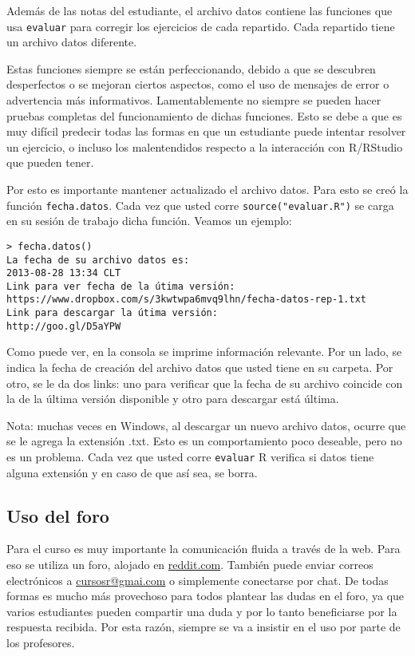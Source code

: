 \documentclass[]{article}
\begin{document}
Además de las notas del estudiante, el archivo datos contiene las
funciones que usa \texttt{evaluar} para corregir los ejercicios de cada
repartido. Cada repartido tiene un archivo datos diferente.

Estas funciones siempre se están perfeccionando, debido a que se
descubren desperfectos o se mejoran ciertos aspectos, como el uso de
mensajes de error o advertencia más informativos. Lamentablemente no
siempre se pueden hacer pruebas completas del funcionamiento de dichas
funciones. Esto se debe a que es muy difícil predecir todas las formas
en que un estudiante puede intentar resolver un ejercicio, o incluso los
malentendidos respecto a la interacción con R/RStudio que pueden tener.

Por esto es importante mantener actualizado el archivo datos. Para esto
se creó la función \texttt{fecha.datos}. Cada vez que usted corre
\texttt{source("evaluar.R")} se carga en su sesión de trabajo dicha
función. Veamos un ejemplo:

\begin{verbatim}
> fecha.datos()
La fecha de su archivo datos es:
2013-08-28 13:34 CLT 
Link para ver fecha de la útima versión:
https://www.dropbox.com/s/3kwtwpa6mvq9lhn/fecha-datos-rep-1.txt 
Link para descargar la útima versión:
http://goo.gl/D5aYPW 
\end{verbatim}
Como puede ver, en la consola se imprime información relevante. Por un
lado, se indica la fecha de creación del archivo datos que usted tiene
en su carpeta. Por otro, se le da dos links: uno para verificar que la
fecha de su archivo coincide con la de la última versión disponible y
otro para descargar está última.

Nota: muchas veces en Windows, al descargar un nuevo archivo datos,
ocurre que se le agrega la extensión .txt. Esto es un comportamiento
poco deseable, pero no es un problema. Cada vez que usted corre
\texttt{evaluar} R verifica si datos tiene alguna extensión y en caso de
que así sea, se borra.

\subsection{Uso del foro}

Para el curso es muy importante la comunicación fluida a través de la
web. Para eso se utiliza un foro, alojado en
\href{reddit.com/r/imser}{reddit.com}. También puede enviar correos
electrónicos a \href{mailto:cursosr@gmail.com}{cursosr@gmai.com} o
simplemente conectarse por chat. De todas formas es mucho más provechoso
para todos plantear las dudas en el foro, ya que varios estudiantes
pueden compartir una duda y por lo tanto beneficiarse por la respuesta
recibida. Por esta razón, siempre se va a insistir en el uso por parte
de los profesores.
\end{document}
